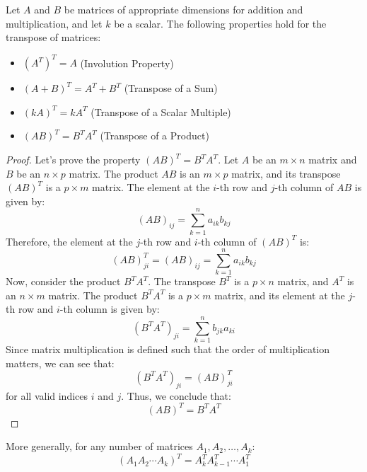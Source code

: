 \begin{theorem}
    Let \( A \) and \( B \) be matrices of appropriate dimensions for addition and multiplication, and let \( k \) be a scalar. The following properties hold for the transpose of matrices:
    \begin{itemize}[itemsep=1pt,label=$\circ$]
        \item \( (A^T)^T = A \) (Involution Property)
        \item \( (A + B)^T = A^T + B^T \) (Transpose of a Sum)
        \item \( (kA)^T = kA^T \) (Transpose of a Scalar Multiple)
        \item \( (AB)^T = B^T A^T \) (Transpose of a Product)
    \end{itemize}
\end{theorem}
\begin{proof}
    Let's prove the property \( (AB)^T = B^T A^T \). Let \( A \) be an \( m \times n \) matrix and \( B \) be an \( n \times p \) matrix. The product \( AB \) is an \( m \times p \) matrix, and its transpose \( (AB)^T \) is a \( p \times m \) matrix. The element at the \( i \)-th row and \( j \)-th column of \( AB \) is given by:
    \[
        (AB)_{ij} = \sum_{k=1}^{n} a_{ik} b_{kj}
    \]
    Therefore, the element at the \( j \)-th row and \( i \)-th column of \( (AB)^T \) is:
    \[
        (AB)^T_{ji} = (AB)_{ij} = \sum_{k=1}^{n} a_{ik} b_{kj}
    \]
    Now, consider the product \( B^T A^T \). The transpose \( B^T \) is a \( p \times n \) matrix, and \( A^T \) is an \( n \times m \) matrix. The product \( B^T A^T \) is a \( p \times m \) matrix, and its element at the \( j \)-th row and \( i \)-th column is given by:
    \[
        (B^T A^T)_{ji} = \sum_{k=1}^{n} b_{jk} a_{ki}
    \]
    Since matrix multiplication is defined such that the order of multiplication matters, we can see that:
    \[
        (B^T A^T)_{ji} = (AB)^T_{ji}
    \]
    for all valid indices \( i \) and \( j \). Thus, we conclude that:
    \[
        (AB)^T = B^T A^T
    \]
\end{proof}
More generally, for any number of matrices \( A_1, A_2, \ldots, A_k \):
\[
    (A_1 A_2 \cdots A_k)^T = A_k^T A_{k-1}^T \cdots A_1^T
\]

